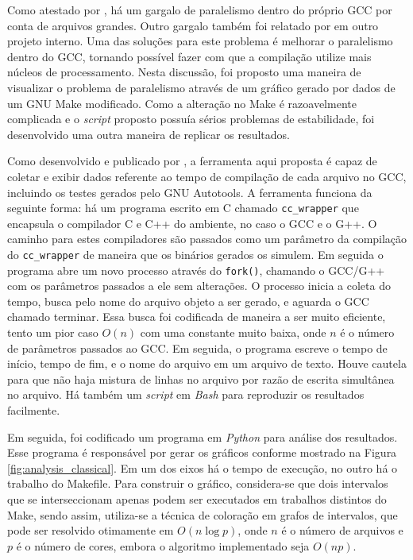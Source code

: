 Como atestado por \cite{PR84402}, há um gargalo de paralelismo dentro do
próprio GCC por conta de arquivos grandes. Outro gargalo também foi relatado
por \cite{mailgcc} em outro projeto interno. Uma das soluções para este
problema é melhorar o paralelismo dentro do GCC, tornando possível fazer
com que a compilação utilize mais núcleos de processamento.
Nesta discussão, foi proposto uma maneira de visualizar o problema de
paralelismo através de um gráfico gerado por dados de um GNU Make modificado.
Como a alteração no Make é razoavelmente complicada e o \textit{script} proposto
possuía sérios problemas de estabilidade, foi desenvolvido uma outra maneira
de replicar os resultados.

Como desenvolvido e publicado por \cite{gcctimer}, a ferramenta aqui proposta
é capaz de coletar e exibir dados referente ao tempo de compilação
de cada arquivo no GCC, incluindo os testes gerados pelo GNU Autotools.
A ferramenta funciona da seguinte forma: há um programa escrito em C chamado
\texttt{cc\_wrapper} que encapsula o compilador C e C++ do ambiente, no caso o 
GCC e o G++. O caminho para estes compiladores são passados como um parâmetro
da compilação do \texttt{cc\_wrapper} de maneira que os binários gerados os
simulem. Em seguida o programa abre um novo processo através do \texttt{fork()},
chamando o GCC/G++ com os parâmetros passados a ele sem alterações. O processo
inicia a coleta do tempo, busca pelo nome do arquivo objeto a ser gerado, e
aguarda o GCC chamado terminar. Essa busca foi codificada de maneira a ser
muito eficiente, tento um pior caso $O(n)$ com uma constante muito baixa,
onde $n$ é o número de parâmetros passados ao GCC. Em seguida, o programa
escreve o tempo de início, tempo de fim, e o nome do arquivo em um arquivo
de texto. Houve cautela para que não haja mistura de linhas
no arquivo por razão de escrita simultânea no arquivo. Há também um \textit{script}
em \textit{Bash} para reproduzir os resultados facilmente.

Em seguida, foi codificado um programa em \textit{Python} para análise dos
resultados. Esse programa é responsável por gerar os gráficos conforme
mostrado na Figura \ref{fig:analysis_classical}. Em um dos eixos há o
tempo de execução, no outro há
o trabalho do Makefile. Para construir o gráfico, considera-se que
dois intervalos que se interseccionam apenas podem ser executados em
trabalhos distintos do Make, sendo assim, utiliza-se a técnica
de coloração em grafos de intervalos, que pode ser resolvido otimamente
em $O(n \log p)$, onde $n$ é o número de arquivos e $p$ é o número de
cores, embora o algoritmo
implementado seja $O(np)$.

